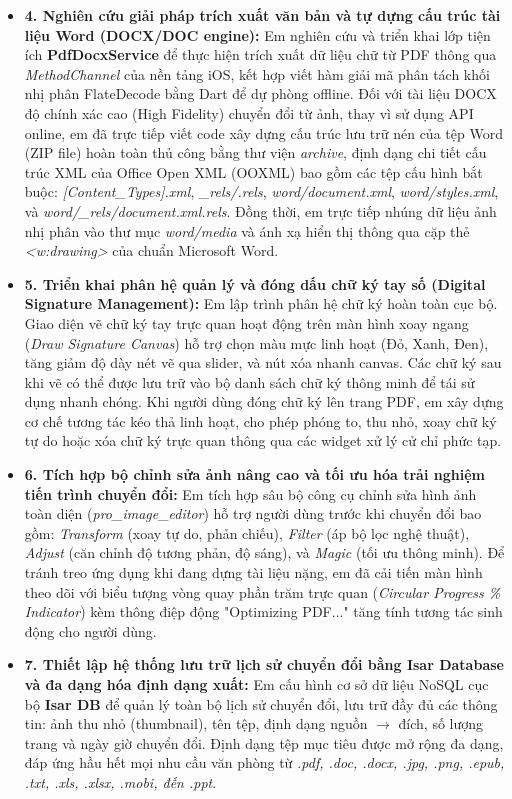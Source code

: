 \documentclass[12pt, a4paper]{article}
\begin{document}
\begin{itemize}
    \item \textbf{4. Nghiên cứu giải pháp trích xuất văn bản và tự dựng cấu trúc tài liệu Word (DOCX/DOC engine):}
    Em nghiên cứu và triển khai lớp tiện ích \textbf{PdfDocxService} để thực hiện trích xuất dữ liệu chữ từ PDF thông qua \textit{MethodChannel} của nền tảng iOS, kết hợp viết hàm giải mã phân tách khối nhị phân FlateDecode bằng Dart để dự phòng offline. Đối với tài liệu DOCX độ chính xác cao (High Fidelity) chuyển đổi từ ảnh, thay vì sử dụng API online, em đã trực tiếp viết code xây dựng cấu trúc lưu trữ nén của tệp Word (ZIP file) hoàn toàn thủ công bằng thư viện \textit{archive}, định dạng chi tiết cấu trúc XML của Office Open XML (OOXML) bao gồm các tệp cấu hình bắt buộc: \textit{[Content\_Types].xml}, \textit{\_rels/.rels}, \textit{word/document.xml}, \textit{word/styles.xml}, và \textit{word/\_rels/document.xml.rels}. Đồng thời, em trực tiếp nhúng dữ liệu ảnh nhị phân vào thư mục \textit{word/media} và ánh xạ hiển thị thông qua cặp thẻ \textit{<w:drawing>} của chuẩn Microsoft Word.

    \item \textbf{5. Triển khai phân hệ quản lý và đóng dấu chữ ký tay số (Digital Signature Management):}
    Em lập trình phân hệ chữ ký hoàn toàn cục bộ. Giao diện vẽ chữ ký tay trực quan hoạt động trên màn hình xoay ngang (\textit{Draw Signature Canvas}) hỗ trợ chọn màu mực linh hoạt (Đỏ, Xanh, Đen), tăng giảm độ dày nét vẽ qua slider, và nút xóa nhanh canvas. Các chữ ký sau khi vẽ có thể được lưu trữ vào bộ danh sách chữ ký thông minh để tái sử dụng nhanh chóng. Khi người dùng đóng chữ ký lên trang PDF, em xây dựng cơ chế tương tác kéo thả linh hoạt, cho phép phóng to, thu nhỏ, xoay chữ ký tự do hoặc xóa chữ ký trực quan thông qua các widget xử lý cử chỉ phức tạp.

    \item \textbf{6. Tích hợp bộ chỉnh sửa ảnh nâng cao và tối ưu hóa trải nghiệm tiến trình chuyển đổi:}
    Em tích hợp sâu bộ công cụ chỉnh sửa hình ảnh toàn diện (\textit{pro\_image\_editor}) hỗ trợ người dùng trước khi chuyển đổi bao gồm: \textit{Transform} (xoay tự do, phản chiếu), \textit{Filter} (áp bộ lọc nghệ thuật), \textit{Adjust} (căn chỉnh độ tương phản, độ sáng), và \textit{Magic} (tối ưu thông minh). Để tránh treo ứng dụng khi đang dựng tài liệu nặng, em đã cải tiến màn hình theo dõi với biểu tượng vòng quay phần trăm trực quan (\textit{Circular Progress \% Indicator}) kèm thông điệp động "Optimizing PDF..." tăng tính tương tác sinh động cho người dùng.

    \item \textbf{7. Thiết lập hệ thống lưu trữ lịch sử chuyển đổi bằng Isar Database và đa dạng hóa định dạng xuất:}
    Em cấu hình cơ sở dữ liệu NoSQL cục bộ \textbf{Isar DB} để quản lý toàn bộ lịch sử chuyển đổi, lưu trữ đầy đủ các thông tin: ảnh thu nhỏ (thumbnail), tên tệp, định dạng nguồn $\rightarrow$ đích, số lượng trang và ngày giờ chuyển đổi. Định dạng tệp mục tiêu được mở rộng đa dạng, đáp ứng hầu hết mọi nhu cầu văn phòng từ \textit{.pdf, .doc, .docx, .jpg, .png, .epub, .txt, .xls, .xlsx, .mobi, đến .ppt}.
\end{itemize}
\end{document}
